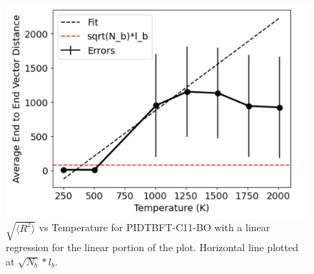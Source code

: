 \begin{figure}
    \centering
    \includegraphics[width=0.6\linewidth]{src/figures/pers_l_figs/e-e plots/PIDT_FBT.png}
    \caption{$\sqrt{\langle R^2 \rangle}$ vs Temperature for PIDTBFT-C11-BO with a linear regression for the linear portion of the plot. Horizontal line plotted at $\sqrt{N_b}*l_b$.}
    \label{fig:e-e_FBT}
\end{figure}